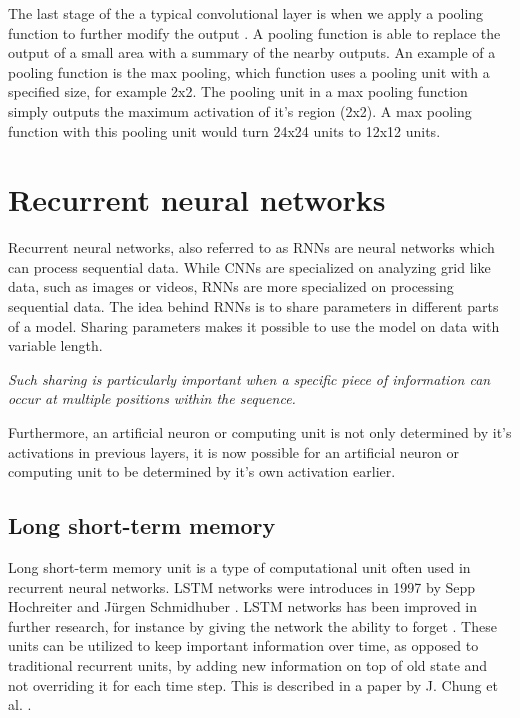 The last stage of the a typical convolutional layer is when we apply a pooling function to further modify the output \parencite{zhou_computation_1988}. A pooling function is able to replace the output of a small area with a summary of the nearby outputs. An example of a pooling function is the max pooling, which function uses a pooling unit with a specified size, for example 2x2. The pooling unit in a max pooling function simply outputs the maximum activation of it's region (2x2). A max pooling function with this pooling unit would turn 24x24 units to 12x12 units. \cite{goodfellow_deep_2016} \cite{nielsen_neural_2015}

\section{Recurrent neural networks}

Recurrent neural networks, also referred to as RNNs  are neural networks which can process sequential data\parencite{rumelhart_learning_1986}. While CNNs are specialized on analyzing grid like data, such as images or videos, RNNs are more specialized on processing sequential data. The idea behind RNNs is to share parameters in different parts of a model. Sharing parameters makes it possible to use the model on data with variable length. \begin{displayquote}
 \textit{Such sharing is particularly important when a specific piece of information can occur at multiple positions within the sequence.}
\end{displayquote}
Furthermore, an artificial neuron or computing unit is not only determined by it's activations in previous layers, it is now possible for an artificial neuron or computing unit to be determined by it's own activation earlier. \parencite{goodfellow_deep_2016} \cite{nielsen_neural_2015}


\subsection{Long short-term memory}
\label{theory-LSTM}
Long short-term memory unit is a type of computational unit often used in recurrent neural networks. LSTM networks were introduces in 1997 by Sepp Hochreiter and Jürgen Schmidhuber \cite{hochreiter_long_1997}. LSTM networks has been improved in further research, for instance by giving the network the ability to forget \cite{gers_learning_1999}. These units can be utilized to keep important information over time, as opposed to traditional recurrent units, by adding new information on top of old state and not overriding it for each time step. This is described in a paper by J. Chung et al. \cite{chung_empirical_2014}.

